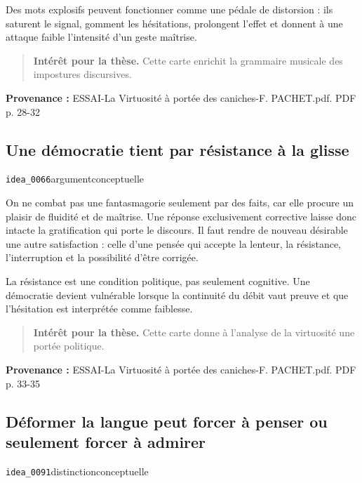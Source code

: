 \documentclass[10pt,a4paper]{article}
\begin{document}
Des mots explosifs peuvent fonctionner comme une pédale de distorsion : ils saturent le signal, gomment les hésitations, prolongent l'effet et donnent à une attaque faible l'intensité d'un geste maîtrise.

\begin{quote}
\textbf{Intérêt pour la thèse.} Cette carte enrichit la grammaire musicale des impostures discursives.
\end{quote}
{\footnotesize\color{metadata}\textbf{Provenance :} ESSAI-La Virtuosité à portée des caniches-F. PACHET.pdf. PDF p. 28-32\par}

\subsection{Une démocratie tient par résistance à la glisse}
{\small\color{metadata} \texttt{idea\_0066}\quad\textbullet\quad argument\quad\textbullet\quad conceptuelle\par}

On ne combat pas une fantasmagorie seulement par des faits, car elle procure un plaisir de fluidité et de maîtrise. Une réponse exclusivement corrective laisse donc intacte la gratification qui porte le discours. Il faut rendre de nouveau désirable une autre satisfaction : celle d'une pensée qui accepte la lenteur, la résistance, l'interruption et la possibilité d'être corrigée.

La résistance est une condition politique, pas seulement cognitive. Une démocratie devient vulnérable lorsque la continuité du débit vaut preuve et que l'hésitation est interprétée comme faiblesse.

\begin{quote}
\textbf{Intérêt pour la thèse.} Cette carte donne à l'analyse de la virtuosité une portée politique.
\end{quote}
{\footnotesize\color{metadata}\textbf{Provenance :} ESSAI-La Virtuosité à portée des caniches-F. PACHET.pdf. PDF p. 33-35\par}

\subsection{Déformer la langue peut forcer à penser ou seulement forcer à admirer}
{\small\color{metadata} \texttt{idea\_0091}\quad\textbullet\quad distinction\quad\textbullet\quad conceptuelle\par}
\end{document}
